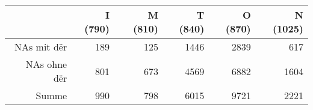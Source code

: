 \begin{tabular}{rrrrrr}
  \hline
 & I (790) & M (810) & T (840) & O (870) & N (1025) \\ 
  \hline
NAs mit dër & 189 & 125 & 1446 & 2839 & 617 \\ 
  NAs ohne dër & 801 & 673 & 4569 & 6882 & 1604 \\ 
  Summe & 990 & 798 & 6015 & 9721 & 2221 \\ 
   \hline
\end{tabular}
